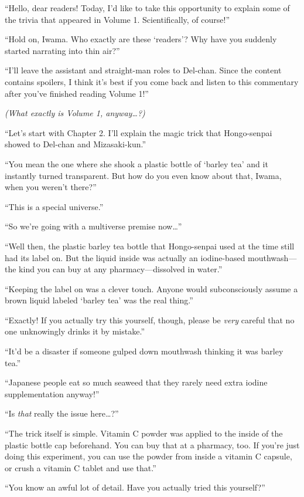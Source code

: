 \documentclass[
    a4paper,
    12pt,
    twoside,
    openany,
    UTF8,
    fontset=windows
]{ctexbook}
\begin{document}
``Hello, dear readers! Today, I'd like to take this opportunity to explain some of the trivia that appeared in Volume 1. Scientifically, of course!''

``Hold on, Iwama. Who exactly are these `readers'? Why have you suddenly started narrating into thin air?''

``I'll leave the assistant and straight-man roles to Del-chan. Since the content contains spoilers, I think it's best if you come back and listen to this commentary after you've finished reading Volume 1!''

\textit{(What exactly \textit{is} Volume 1, anyway\dots?)}

``Let's start with Chapter 2. I'll explain the magic trick that Hongo-senpai showed to Del-chan and Mizasaki-kun.''

``You mean the one where she shook a plastic bottle of `barley tea' and it instantly turned transparent. But how do you even know about that, Iwama, when you weren't there?''

``This is a special universe.''

``So we're going with a multiverse premise now\dots''

``Well then, the plastic barley tea bottle that Hongo-senpai used at the time still had its label on. But the liquid inside was actually an iodine-based mouthwash---the kind you can buy at any pharmacy---dissolved in water.''

``Keeping the label on was a clever touch. Anyone would subconsciously assume a brown liquid labeled `barley tea' was the real thing.''

``Exactly! If you actually try this yourself, though, please be \textit{very} careful that no one unknowingly drinks it by mistake.''

``It'd be a disaster if someone gulped down mouthwash thinking it was barley tea.''

``Japanese people eat so much seaweed that they rarely need extra iodine supplementation anyway!''

``Is \textit{that} really the issue here\dots?''

``The trick itself is simple. Vitamin C powder was applied to the inside of the plastic bottle cap beforehand. You can buy that at a pharmacy, too. If you're just doing this experiment, you can use the powder from inside a vitamin C capsule, or crush a vitamin C tablet and use that.''

``You know an awful lot of detail. Have you actually tried this yourself?''
\end{document}
